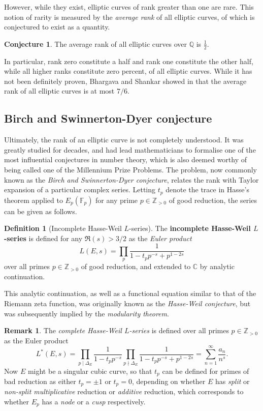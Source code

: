 \documentclass{article}
\newcommand{\F}{\mathbb{F}}
\newcommand{\Z}{\mathbb{Z}}
\newcommand{\Q}{\mathbb{Q}}
\newcommand{\C}{\mathbb{C}}
\newcommand{\rb}[1]{\left( #1 \right)}
\theoremstyle{definition}
\newtheorem*{definition}{Definition}
\newtheorem*{remark}{Remark}
\newtheorem{conjecture}[proposition]{Conjecture}
\begin{document}
However, while they exist, elliptic curves of rank greater than one are rare. This notion of rarity is measured by the \emph{average rank} of all elliptic curves, of which is conjectured to exist as a quantity.

\begin{conjecture}
The average rank of all elliptic curves over $ \Q $ is $ \tfrac{1}{2} $.
\end{conjecture}

In particular, rank zero constitute a half and rank one constitute the other half, while all higher ranks constitute zero percent, of all elliptic curves. While it has not been definitely proven, Bhargava and Shankar showed in \cite{rankaverage} that the average rank of all elliptic curves is at most $ 7 / 6 $.

\pagebreak

\subsection{Birch and Swinnerton-Dyer conjecture}

Ultimately, the rank of an elliptic curve is not completely understood. It was greatly studied for decades, and had lead mathematicians to formalise one of the most influential conjectures in number theory, which is also deemed worthy of being called one of the Millennium Prize Problems. The problem, now commonly known as the \emph{Birch and Swinnerton-Dyer conjecture}, relates the rank with Taylor expansion of a particular complex series. Letting $ t_p $ denote the trace in Hasse's theorem applied to $ E_p\rb{\F_p} $ for any prime $ p \in \Z_{> 0} $ of good reduction, the series can be given as follows.

\begin{definition}[Incomplete Hasse-Weil $ L $-series]
The \textbf{incomplete Hasse-Weil $ L $-series} is defined for any $ \Re\rb{s} > 3 / 2 $ as the \emph{Euler product}
$$ L\rb{E, s} = \prod_p \dfrac{1}{1 - t_pp^{-s} + p^{1 - 2s}} $$
over all primes $ p \in \Z_{> 0} $ of good reduction, and extended to $ \C $ by analytic continuation.
\end{definition}

This analytic continuation, as well as a functional equation similar to that of the Riemann zeta function, was originally known as the \emph{Hasse-Weil conjecture}, but was subsequently implied by the \emph{modularity theorem}.

\begin{remark}
The \emph{complete Hasse-Weil $ L $-series} is defined over all primes $ p \in \Z_{> 0} $ as the Euler product
$$ L^*\rb{E, s} = \prod_{p \mid \Delta_E} \dfrac{1}{1 - t_pp^{-s}} \prod_{p \nmid \Delta_E} \dfrac{1}{1 - t_pp^{-s} + p^{1 - 2s}} = \sum_{n = 1}^\infty \dfrac{a_n}{n^s}. $$
Now $ E $ might be a singular cubic curve, so that $ t_p $ can be defined for primes of bad reduction as either $ t_p = \pm 1 $ or $ t_p = 0 $, depending on whether $ E $ has \emph{split} or \emph{non-split multiplicative} reduction or \emph{additive} reduction, which corresponds to whether $ E_p $ has a \emph{node} or a \emph{cusp} respectively.
\end{remark}
\end{document}
